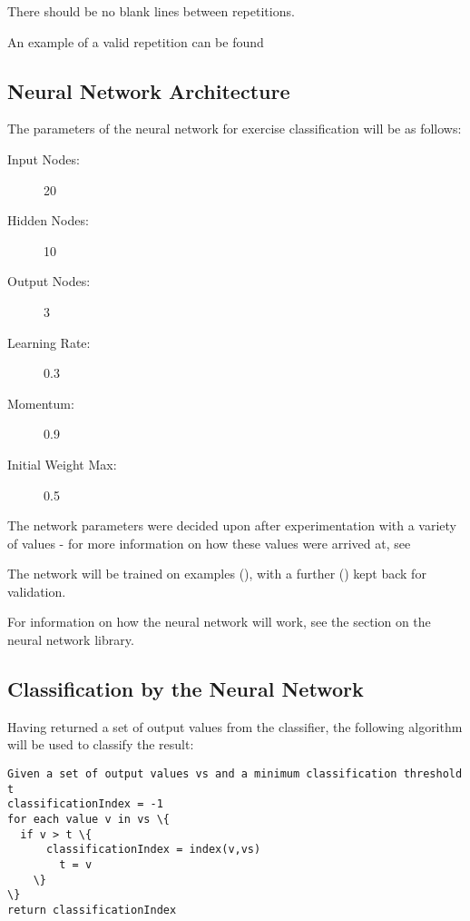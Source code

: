 \documentclass[a4paper]{article}
\begin{document}
There should be no blank lines between repetitions.

An example of a valid repetition can be found 

\subsection{Neural Network Architecture}%

The parameters of the neural network for exercise classification will be as follows:

\begin{description}
\item[Input Nodes: ] 20
\item[Hidden Nodes: ] 10
\item[Output Nodes: ] 3
\item[Learning Rate:] 0.3
\item[Momentum: ] 0.9
\item[Initial Weight Max: ] 0.5
\end{description}


The network parameters were decided upon after experimentation with a variety of values - for more information on how these values were arrived at, see 

The network will be trained on  examples (), with a further  () kept back for validation.

For information on how the neural network will work, see the section on the neural network library. 

\subsection{Classification by the Neural Network}%

Having returned a set of output values from the classifier, the following algorithm will be used to classify the result:

\begin{lstlisting}
Given a set of output values vs and a minimum classification threshold t
classificationIndex = -1
for each value v in vs \{
  if v > t \{
      classificationIndex = index(v,vs)
        t = v
    \}
\}
return classificationIndex
\end{lstlisting}
\end{document}
